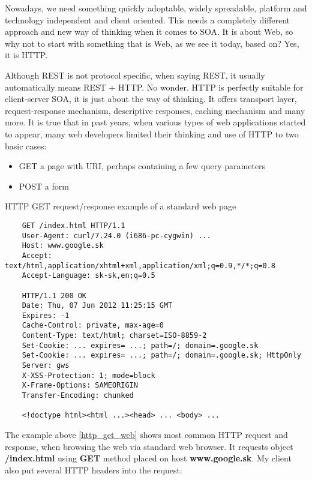 	Nowadays, we need something quickly adoptable, widely spreadable, platform and technology independent and client
	oriented. This needs a completely different approach and new way of thinking when it comes to \gls{SOA}. It is about
	Web, so why not to start with something that is Web, as we see it today, based on? Yes, it is \gls{HTTP}.
	
	Although \gls{REST} is not protocol specific, when saying \gls{REST}, it usually automatically means \gls{REST} +
	\gls{HTTP}. No wonder. \gls{HTTP} is perfectly suitable for client-server \gls{SOA}, it is just about the way of
	thinking. It offers transport layer, request-response mechanism, descriptive responses, caching mechanism and many
	more. It is true that in past years, when various types of web applications started to appear, many web developers
	limited their thinking and use of \gls{HTTP} to two basic cases:
	
	\begin{itemize}
	  \item GET a page with \gls{URI}, perhaps containing a few query parameters
	  \item POST a form
	\end{itemize}
	
	\begin{program}
	\caption{HTTP GET request/response example of a standard web page}\label{http_get_web}
	\begin{verbatim}
	GET /index.html HTTP/1.1
	User-Agent: curl/7.24.0 (i686-pc-cygwin) ...
	Host: www.google.sk
	Accept: text/html,application/xhtml+xml,application/xml;q=0.9,*/*;q=0.8
	Accept-Language: sk-sk,en;q=0.5

	HTTP/1.1 200 OK
	Date: Thu, 07 Jun 2012 11:25:15 GMT
	Expires: -1
	Cache-Control: private, max-age=0
	Content-Type: text/html; charset=ISO-8859-2
	Set-Cookie: ... expires= ...; path=/; domain=.google.sk
	Set-Cookie: ... expires= ...; path=/; domain=.google.sk; HttpOnly
	Server: gws
	X-XSS-Protection: 1; mode=block
	X-Frame-Options: SAMEORIGIN
	Transfer-Encoding: chunked

	<!doctype html><html ...><head> ... <body> ...
	\end{verbatim}
	\end{program}
	
	The example above \ref{http_get_web} shows most common HTTP request and response, when browsing the web via standard
	web browser. It requests object \textbf{/index.html} using \textbf{GET} method placed on host \textbf{www.google.sk}.
	My client also put several HTTP headers into the request:
	
